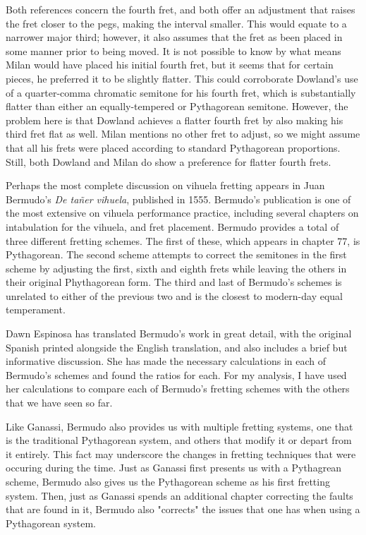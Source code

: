 Both references concern the fourth fret, and both offer an adjustment that raises the fret closer
to the pegs, making the interval smaller.  This would equate to a narrower major third; however,
it also assumes that the fret as been placed in some manner prior to being moved.  It is not
possible to know by what means Milan would have placed his initial fourth fret, but it seems
that for certain pieces, he preferred it to be slightly flatter.  This could corroborate
Dowland's use of a quarter-comma chromatic semitone for his fourth fret, which is substantially
flatter than either an equally-tempered or Pythagorean semitone.  However, the problem here
is that Dowland achieves a flatter fourth fret by also making his third fret flat as well.  Milan
mentions no other fret to adjust, so we might assume that all his frets were placed according
to standard Pythagorean proportions.  Still, both Dowland and Milan
do show a preference for flatter fourth frets.

Perhaps the most complete discussion on vihuela fretting appears in Juan Bermudo's \textit{De ta\~{n}er vihuela},
published in 1555.  Bermudo's publication is one of the most extensive on vihuela performance practice,
including several chapters on intabulation for the vihuela, and fret placement.  Bermudo provides a
total of three different fretting schemes.  The first of these, which appears in chapter
77, is Pythagorean.  The second scheme attempts to correct the semitones in the first
scheme by adjusting the first, sixth and eighth frets while leaving the others in their
original Phythagorean form.  The third and last of Bermudo's schemes is unrelated to either
of the previous two and is the closest to modern-day equal temperament.

Dawn Espinosa has translated Bermudo's work in great detail, with the original Spanish printed alongside
the English translation, and also includes a brief but informative discussion.  She has made
the necessary calculations in each of Bermudo's schemes and found the ratios for each.
For my analysis, I have used her calculations to compare each of Bermudo's fretting schemes
with the others that we have seen so far.

Like Ganassi, Bermudo also provides us with multiple fretting systems, one that is the traditional
Pythagorean system, and others that modify it or depart from it entirely.  This fact
may underscore the changes in fretting techniques that were occuring during the time.  Just as
Ganassi first presents us with a Pythagrean scheme, Bermudo also gives us the Pythagorean scheme
as his first fretting system.  Then, just as Ganassi spends an additional chapter correcting
the faults that are found in it, Bermudo also "corrects" the issues that one has when using
a Pythagorean system.

